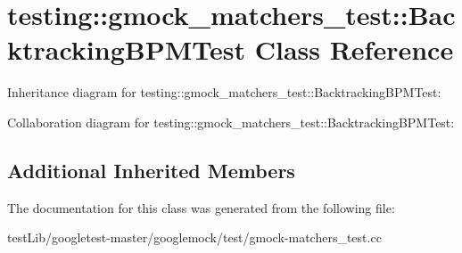 \hypertarget{classtesting_1_1gmock__matchers__test_1_1BacktrackingBPMTest}{}\section{testing\+:\+:gmock\+\_\+matchers\+\_\+test\+:\+:Backtracking\+B\+P\+M\+Test Class Reference}
\label{classtesting_1_1gmock__matchers__test_1_1BacktrackingBPMTest}


Inheritance diagram for testing\+:\+:gmock\+\_\+matchers\+\_\+test\+:\+:Backtracking\+B\+P\+M\+Test\+:


Collaboration diagram for testing\+:\+:gmock\+\_\+matchers\+\_\+test\+:\+:Backtracking\+B\+P\+M\+Test\+:
\subsection*{Additional Inherited Members}


The documentation for this class was generated from the following file\+:\begin{DoxyCompactItemize}
\item 
test\+Lib/googletest-\/master/googlemock/test/gmock-\/matchers\+\_\+test.\+cc\end{DoxyCompactItemize}
